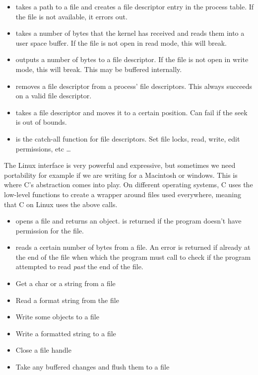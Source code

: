  \begin{itemize}
\item {} takes a path to a file and creates a file descriptor entry in the process table. If the file is not available, it errors out.
\item {} takes a number of bytes that the kernel has received and reads them into a user space buffer. If the file is not open in read mode, this will break.
\item {} outputs a number of bytes to a file descriptor. If the file is not open in write mode, this will break. This may be buffered internally.
\item {} removes a file descriptor from a process' file descriptors. This always succeeds on a valid file descriptor.
\item {} takes a file descriptor and moves it to a certain position. Can fail if the seek is out of bounds.
\item {} is the catch-all function for file descriptors. Set file locks, read, write, edit permissions, etc \ldots{}
 \end{itemize}

The Linux interface is very powerful and expressive, but sometimes we need portability for example if we are writing for a Macintosh or windows.
This is where C's abstraction comes into play.
On different operating systems, C uses the low-level functions to create a wrapper around files used everywhere, meaning that C on Linux uses the above calls.

\begin{itemize}
\item {} opens a file and returns an object.  is returned if the program doesn't have permission for the file.
\item {} reads a certain number of bytes from a file. An error is returned if already at the end of the file when which the program must call  to check if the program attempted to read \textit{past} the end of the file.
\item {} Get a char or a string from a file
\item {} Read a format string from the file
\item {} Write some objects to a file
\item {} Write a formatted string to a file
\item {} Close a file handle
\item {} Take any buffered changes and flush them to a file
\end{itemize}

